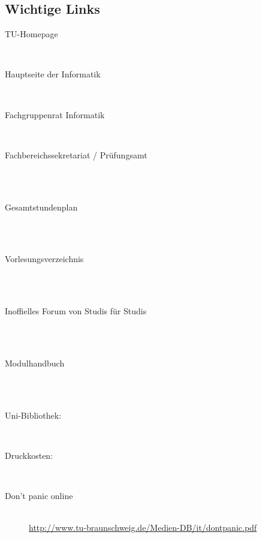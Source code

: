 \begin{multicols}{2}
\subsection*{Wichtige Links}
\begin{description}
  \item[TU-Homepage]~\\
 \item[Hauptseite der Informatik]~\\
 \item[Fachgruppenrat Informatik]~\\
 \item[Fachbereichssekretariat / Prüfungsamt]~\\
 \\
\item[Gesamtstundenplan]~\\\\
\item[Vorlesungsverzeichnis]~\\\\
\item[Inoffielles Forum von Studis für
  Studis]~\\\\
\item[Modulhandbuch]~\\\\
\item[Uni-Bibliothek:] ~\\
\item[Druckkosten:] ~\\
\item[Don't panic online] ~\\
{\footnotesize\url{http://www.tu-braunschweig.de/Medien-DB/it/dontpanic.pdf}}
\end{description}


\end{multicols}

